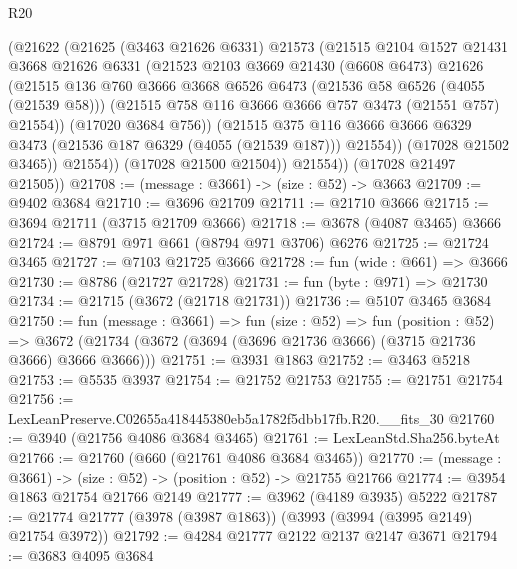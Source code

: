 \begin{lexlean}{R20}
\begin{coremodule}
              (@21622
                (@21625
                  (@3463 @21626 @6331)
                  @21573
                  (@21515
                    @2104
                    @1527
                    @21431
                    @3668
                    @21626
                    @6331
                    (@21523
                      @2103
                      @3669
                      @21430
                      (@6608 @6473)
                      @21626
                      (@21515
                        @136
                        @760
                        @3666
                        @3668
                        @6526
                        @6473
                        (@21536 @58 @6526 (@4055 (@21539 @58)))
                        (@21515 @758 @116 @3666 @3666 @757 @3473 (@21551 @757) @21554))
                      (@17020 @3684 @756))
                    (@21515
                      @375
                      @116
                      @3666
                      @3666
                      @6329
                      @3473
                      (@21536 @187 @6329 (@4055 (@21539 @187)))
                      @21554))
                  (@17028 @21502 @3465))
                @21554))
            (@17028 @21500 @21504))
          @21554))
      (@17028 @21497 @21505))
@21708 := (message : @3661) -> (size : @52) -> @3663
@21709 := @9402 @3684
@21710 := @3696 @21709
@21711 := @21710 @3666
@21715 := @3694 @21711 (@3715 @21709 @3666)
@21718 := @3678 (@4087 @3465) @3666
@21724 := @8791 @971 @661 (@8794 @971 @3706) @6276
@21725 := @21724 @3465
@21727 := @7103 @21725 @3666
@21728 := fun (wide : @661) => @3666
@21730 := @8786 (@21727 @21728)
@21731 := fun (byte : @971) => @21730
@21734 := @21715 (@3672 (@21718 @21731))
@21736 := @5107 @3465 @3684
@21750 := fun (message : @3661) =>
  fun (size : @52) =>
  fun (position : @52) =>
  @3672 (@21734 (@3672 (@3694 (@3696 @21736 @3666) (@3715 @21736 @3666) @3666 @3666)))
@21751 := @3931 @1863
@21752 := @3463 @5218
@21753 := @5535 @3937
@21754 := @21752 @21753
@21755 := @21751 @21754
@21756 := LexLeanPreserve.C02655a418445380eb5a1782f5dbb17fb.R20.__fits_30
@21760 := @3940 (@21756 @4086 @3684 @3465)
@21761 := LexLeanStd.Sha256.byteAt
@21766 := @21760 (@660 (@21761 @4086 @3684 @3465))
@21770 := (message : @3661) -> (size : @52) -> (position : @52) -> @21755 @21766
@21774 := @3954 @1863 @21754 @21766 @2149
@21777 := @3962 (@4189 @3935) @5222
@21787 := @21774 @21777 (@3978 (@3987 @1863)) (@3993 (@3994 (@3995 @2149) @21754 @3972))
@21792 := @4284 @21777 @2122 @2137 @2147 @3671
@21794 := @3683 @4095 @3684

\end{coremodule}
\end{lexlean}
